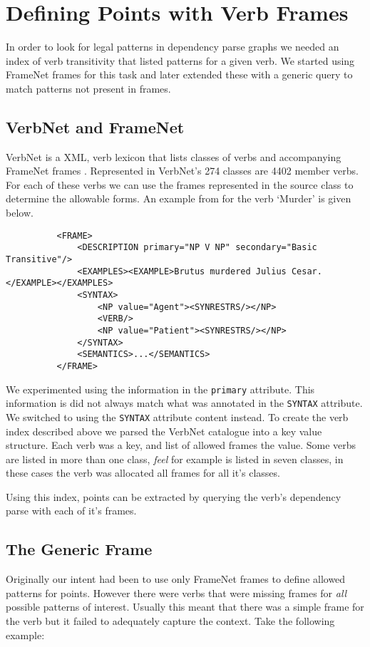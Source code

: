   \section{Defining Points with Verb Frames}
    In order to look for legal patterns in dependency parse graphs we needed an index of verb transitivity that listed patterns for a given verb. We started using FrameNet frames for this task and later extended these with a generic query to match patterns not present in frames.
    \tocless\subsection{VerbNet and FrameNet}
      VerbNet is a XML, verb lexicon that lists classes of verbs and accompanying FrameNet \cite{fillmore2002framenet} frames \cite{schuler2005verbnet}. Represented in VerbNet's 274 classes are 4402 member verbs. For each of these verbs we can use the frames represented in the source class to determine the allowable forms. An example from for the verb `Murder' is given below.

      \lstset{language=XML}
      \begin{lstlisting}
          <FRAME>
              <DESCRIPTION primary="NP V NP" secondary="Basic Transitive"/>
              <EXAMPLES><EXAMPLE>Brutus murdered Julius Cesar.</EXAMPLE></EXAMPLES>
              <SYNTAX>
                  <NP value="Agent"><SYNRESTRS/></NP>
                  <VERB/>
                  <NP value="Patient"><SYNRESTRS/></NP>
              </SYNTAX>
              <SEMANTICS>...</SEMANTICS>
          </FRAME>
      \end{lstlisting}

      We experimented using the information in the \texttt{primary} attribute. This information is did not always match what was annotated in the \texttt{SYNTAX} attribute. We switched to using the \texttt{SYNTAX} attribute content instead. To create the verb index described above we parsed the VerbNet catalogue into a key value structure. Each verb was a key, and list of allowed frames the value. Some verbs are listed in more than one class, \textit{feel} for example is listed in seven classes, in these cases the verb was allocated all frames for all it's classes.

      Using this index, points can be extracted by querying the verb's dependency parse with each of it's frames.

    \tocless\subsection{The Generic Frame}
      Originally our intent had been to use only FrameNet frames to define allowed patterns for points. However there were verbs that were missing frames for \textit{all} possible patterns of interest. Usually this meant that there was a simple frame for the verb but it failed to adequately capture the context. Take the following example:

